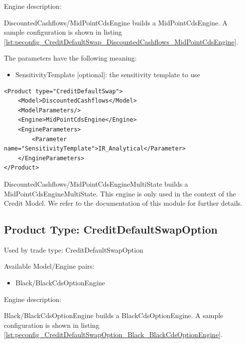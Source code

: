 Engine description:

DiscountedCashflows/MidPointCdsEngine builds a MidPointCdsEngine. A sample configuration is shown in listing
\ref{lst:peconfig_CreditDefaultSwap_DiscountedCashflows_MidPointCdsEngine}.

The parameters have the following meaning:

\begin{itemize}
\item SensitivityTemplate [optional]: the sensitivity template to use
\end{itemize}

\begin{longlisting}
\begin{verbatim}
<Product type="CreditDefaultSwap">
    <Model>DiscountedCashflows</Model>
    <ModelParameters/>
    <Engine>MidPointCdsEngine</Engine>
    <EngineParameters>
        <Parameter name="SensitivityTemplate">IR_Analytical</Parameter>
    </EngineParameters>
</Product>
\end{verbatim}
\caption{Configuration for Product CreditDefaultSwap, Model DiscountedCashflows, Engine MidPointCdsEngine}
\label{lst:peconfig_CreditDefaultSwap_DiscountedCashflows_MidPointCdsEngine}
\end{longlisting}

DiscountedCashflows/MidPointCdsEngineMultiState builds a MidPointCdsEngineMultiState. This engine is only used in the
context of the Credit Model. We refer to the documentation of this module for further details.

\subsection{Product Type: CreditDefaultSwapOption}

Used by trade type: CreditDefaultSwapOption

Available Model/Engine pairs:

\begin{itemize}
\item Black/BlackCdsOptionEngine
\end{itemize}

Engine description:

Black/BlackCdsOptionEngine builds a BlackCdsOptionEngine. A sample configuration is shown in listing
\ref{lst:peconfig_CreditDefaultSwapOption_Black_BlackCdsOptionEngine}.


